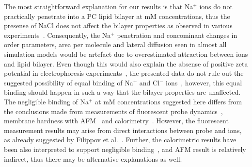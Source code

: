 \documentclass[pre,aps,floatfix,authordate1-4,twocolumn]{revtex4-1}
\begin{document}






The most straightforward explanation for our results is that Na$^+$ ions do not practically penetrate into a PC lipid bilayer
at mM concentrations, thus the presense of NaCl does not affect the bilayer properties as observed in various experiments~\cite{akutsu81,altenbach84,clarke99,binder02,pabst07,filippov09}.
Consequently, the Na$^+$ penetration and concominant changes in order parameters, area per molecule and lateral diffusion 
seen in almost all simulation models would be artefact due to overestimated attraction between ions and lipid bilayer.
Even though this would also explain the absense of positive zeta potential in electrophoresis experiments~\cite{eisenberg79,tatulian87,manyes05,manyes06,klasczyk10},  
the presented data do not rule out the suggested possibility of equal binding of Na$^+$ and Cl$^-$ ions~\cite{knecht13},
however, this equal binding should happen in such a way that the bilayer properties are unaffected.
The negligible binding of Na$^+$ at mM concentrations suggested here differs from the conclusions made from 
measurements of fluorescent probe dynamics~\cite{bockmann03,vacha09a,harb13}, membrane hardness with AFM~\cite{manyes05,manyes06,fukuma07,ferber11,morata12} and calorimetry~\cite{bockmann03,klasczyk10}.
However, the fluorescent measurement results may arise from direct interactions between probe and ions, as already suggested by Filippov et al.~\cite{filippov09}. 
Further, the calorimetric results have been also interpreted to support negligible binding~\cite{cevc90}, and AFM result is relatively indirect, thus
there may be alternative explanations as well.
\end{document}
